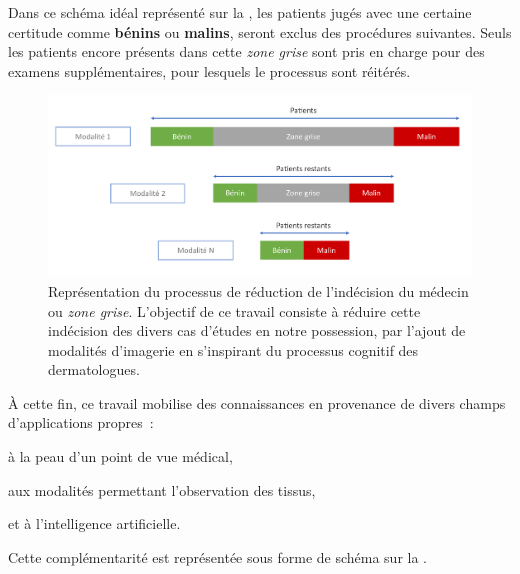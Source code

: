 Dans ce schéma idéal représenté sur la , les patients jugés avec une certaine certitude comme \textbf{bénins} ou \textbf{malins}, seront exclus des procédures suivantes. Seuls les patients encore présents dans cette \textit{zone grise} sont pris en charge pour des examens supplémentaires, pour lesquels le processus sont réitérés.\par 

\begin{figure}[H]
    \centering
    \includegraphics[width=\linewidth]{contents/i_introduction/resources/scheme_reduce_indecision.pdf}
    \caption{Représentation du processus de réduction de l'indécision du médecin ou \textit{zone grise}. L'objectif de ce travail consiste à réduire cette indécision des divers cas d'études en notre possession, par l'ajout de modalités d'imagerie en s'inspirant du processus cognitif des dermatologues.}
    \label{fig:scheme_reduce_indecision}
\end{figure}\par

À cette fin, ce travail mobilise des connaissances en provenance de divers champs d'applications propres~:
\begin{inlinerate}
    \item à la peau d'un point de vue médical, 
    \item aux modalités permettant l'observation des tissus,
    \item et à l'intelligence artificielle.
\end{inlinerate} Cette complémentarité est représentée sous forme de schéma sur la .\par

